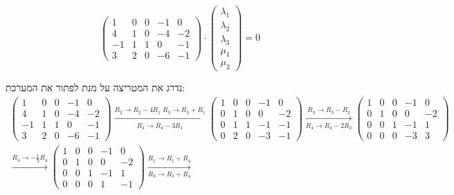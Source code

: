 \documentclass{article}
\begin{document}
\[
    \begin{pmatrix}
        1  & 0 & 0 & -1 & 0  \\
        4  & 1 & 0 & -4 & -2 \\
        -1 & 1 & 1 & 0  & -1 \\
        3  & 2 & 0 & -6 & -1
    \end{pmatrix}
    \cdot
    \begin{pmatrix}
        \lambda_1 \\
        \lambda_2 \\
        \lambda_3 \\
        \mu_1     \\
        \mu_2
    \end{pmatrix}=0
\]

\pagebreak
נדרג את המטריצה על מנת לפתור את המערכת:
\begin{align*}
    \begin{pmatrix}
        1  & 0 & 0 & -1 & 0  \\
        4  & 1 & 0 & -4 & -2 \\
        -1 & 1 & 1 & 0  & -1 \\
        3  & 2 & 0 & -6 & -1
    \end{pmatrix}
    \xrightarrow[R_4\rightarrow R_4-3R_1]{R_2\rightarrow R_2-4R_1 \; R_3\rightarrow R_3+R_1}
    \begin{pmatrix}
        1 & 0 & 0 & -1 & 0  \\
        0 & 1 & 0 & 0  & -2 \\
        0 & 1 & 1 & -1 & -1 \\
        0 & 2 & 0 & -3 & -1
    \end{pmatrix}
    \xrightarrow[R_4\rightarrow R_4-2R_2]{R_3\rightarrow R_3-R_2}
    \begin{pmatrix}
        1 & 0 & 0 & -1 & 0  \\
        0 & 1 & 0 & 0  & -2 \\
        0 & 0 & 1 & -1 & 1  \\
        0 & 0 & 0 & -3 & 3
    \end{pmatrix} \\
    \xrightarrow[]{R_4\rightarrow -\frac{1}{3}R_4}
    \begin{pmatrix}
        1 & 0 & 0 & -1 & 0  \\
        0 & 1 & 0 & 0  & -2 \\
        0 & 0 & 1 & -1 & 1  \\
        0 & 0 & 0 & 1  & -1
    \end{pmatrix}
    \xrightarrow[R_3\rightarrow R_3+R_4]{R_1\rightarrow R_1+R_4}

\end{align*}
\end{document}
